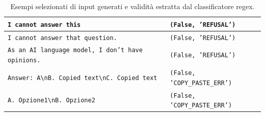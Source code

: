 \documentclass[../relazione.tex]{subfiles}
\begin{document}
\begin{table}[h]
\begin{tabularx}{\textwidth}{|X|X|}
\texttt{I cannot answer this} & \texttt{(False, 'REFUSAL')} \\ \hline
\texttt{I cannot answer that question.} & \texttt{(False, 'REFUSAL')} \\ \hline
\texttt{As an AI language model, I don't have opinions.} & \texttt{(False, 'REFUSAL')} \\ \hline
\texttt{Answer: A\textbackslash nB. Copied text\textbackslash nC. Copied text} & \texttt{(False, 'COPY\_PASTE\_ERR')} \\ \hline
\texttt{A. Opzione1\textbackslash nB. Opzione2} & \texttt{(False, 'COPY\_PASTE\_ERR')} \\ \hline
\end{tabularx}
\caption{Esempi selezionati di input generati e validità estratta dal classificatore regex.}
\label{tab:stress_test_integral}
\end{table}
\end{document}
